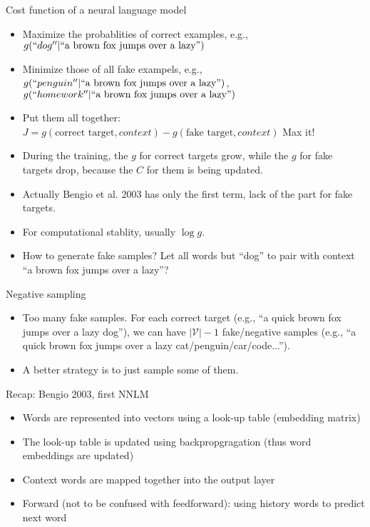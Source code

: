 \documentclass[11pt,handout]{beamer}
\begin{document}
\begin{frame}{Cost function of a neural language model}
 \begin{itemize}[<+->]
  \item Maximize the probablities of correct examples, e.g., $g(``dog''|\text{``a brown fox jumps over a lazy''})$ 
  \item Minimize those of all fake exampels,  e.g., $g(``penguin''|\text{``a brown fox jumps over a lazy''})$, $g(``homework''|\text{``a brown fox jumps over a lazy''})$
  \item Put them all together: 
   $J = g(\text{correct target}, context) - g(\text{fake target}, context)$ 
   Max it! 
  \item During the training, the $g$ for correct targets grow, while the $g$ for fake targets drop, because the $C$ for them is being updated. 
  \item Actually Bengio et al. 2003 has only the first term, lack of the part for fake targets. 
  \item For computational stablity, usually $\log g$.
  \item How to generate fake samples? Let all words but ``dog'' to pair with context ``a brown fox jumps over a lazy''? 
 \end{itemize}
\end{frame}

\begin{frame}{Negative sampling}
 \begin{itemize}[<+->]
  \item Too many fake samples. For each correct target (e.g., ``a quick brown fox jumps over a lazy dog''), we can have $|\mathcal{V}|-1$ fake/negative samples (e.g., ``a quick brown fox jumps over a lazy cat/penguin/car/code...''). 
  \item A better strategy is to just sample some of them. 
 \end{itemize}
\end{frame}

\begin{frame}{Recap: Bengio 2003, first NNLM}
\begin{itemize}[<+->]
  \item Words are represented into vectors using a look-up table (embedding matrix)
  \item The look-up table is updated using backpropgragation (thus word embeddings are updated)
  \item Context words are mapped together into the output layer 
  \item Forward (not to be confused with feedforward): using history words to predict next word 
\end{itemize}
\end{frame}
\end{document}
